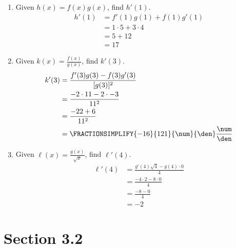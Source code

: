 \documentclass{article}
\begin{document}
\begin{enumerate}
	\item Given $h(x)=f(x)g(x)$, find $h'(1)$.
	$$\begin{align}
		h'(1)&= f'(1)g(1) + f(1)g'(1) \\
		&= 1\cdot 5 + 3 \cdot 4 \\
		&= 5 + 12\\
		&= 17
	\end{align}$$
	\item Given $k(x)=\frac{f(x)}{g(x)}$, find $k'(3)$.
	$$\begin{align}
		k'(3) &= \frac{f'(3)g(3) - f(3)g'(3)}{[g(3)]^2} \\
		&= \frac{-2 \cdot 11 - 2 \cdot -3}{11^2} \\
		&= \frac{-22 + 6}{11^2} \\
		&= \FRACTIONSIMPLIFY{-16}{121}{\num}{\den} \frac{\num}{\den}\\
	\end{align}$$
	\item Given $\ell(x)=\frac{g(x)}{\sqrt{x}}$, find $\ell'(4)$.
	$$\begin{align}
		\ell'(4) &= \frac{g'(4)\sqrt{4} - g(4)\cdot 0}{4} \\
		&= \frac{-4 \cdot 2 - 8 \cdot 0}{4} \\
		&= \frac{-8-0}{4} \\
		&= -2
	\end{align}$$
\end{enumerate}
\pagebreak
\section{Section 3.2}
\end{document}
